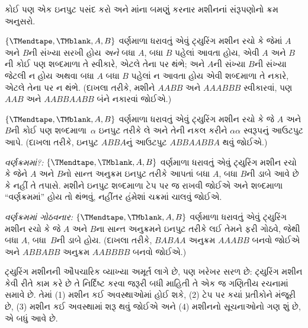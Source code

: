 \begin{prob}
કોઈ પણ એક ઇનપુટ પસંદ કરો અને માંના
બમણું કરનાર મશીનનાં સંરૂપણોનો ક્રમ અનુસરો.
\end{prob}

\begin{prob}
$\{\TMendtape,\TMblank, A, B\}$ વર્ણમાળા ધરાવતું એવું
ટ્યુરિંગ મશીન રચો કે જેમાં $A$ અને $B$ની સંખ્યા સરખી
હોય \emph{અને} બધા $A$, બધા $B$ પહેલાં આવતા હોય,
એવી $A$ અને $B$ની કોઈ પણ શબ્દમાળા તે સ્વીકારે,
એટલે તેના પર થંભે; અને $A$ની સંખ્યા $B$ની સંખ્યા
જેટલી ન હોય અથવા બધા $A$ બધા $B$ પહેલાં ન આવતા
હોય એવી શબ્દમાળા તે નકારે, એટલે તેના પર ન થંભે.
(દાખલા તરીકે, મશીને $AABB$ અને $AAABBB$ સ્વીકારવાં,
પણ $AAB$ અને $AABBAABB$ બંને નકારવાં જોઈએ.)
\end{prob}

\begin{prob}
$\{\TMendtape,\TMblank, A, B\}$ વર્ણમાળા ધરાવતું એવું
ટ્યુરિંગ મશીન રચો કે જે $A$ અને $B$ની કોઈ પણ
શબ્દમાળા~$\alpha$ ઇનપુટ તરીકે લે અને તેની નકલ કરીને
$\alpha\alpha$ સ્વરૂપનું આઉટપુટ આપે. (દાખલા તરીકે,
ઇનપુટ $ABBA$નું આઉટપુટ $ABBAABBA$ થવું જોઈએ.)
\end{prob}

\begin{prob}
\emph{વર્ણક્રમમાં?:} $\{\TMendtape,\TMblank, A, B\}$ વર્ણમાળા
ધરાવતું એવું ટ્યુરિંગ મશીન રચો કે જેને $A$ અને $B$નો
સાન્ત અનુક્રમ ઇનપુટ તરીકે આપતાં બધા $A$, બધા $B$ની
ડાબે આવે છે કે નહીં તે તપાસે. મશીને ઇનપુટ શબ્દમાળા ટેપ
પર જ રાખવી જોઈએ અને શબ્દમાળા ``વર્ણક્રમમાં'' હોય તો
થંભવું, નહીંતર હંમેશાં ચક્રમાં ચાલવું જોઈએ.
\end{prob}

\begin{prob}
\emph{વર્ણક્રમમાં ગોઠવનાર:} $\{\TMendtape,\TMblank, A, B\}$
વર્ણમાળા ધરાવતું એવું ટ્યુરિંગ મશીન રચો કે જે $A$ અને
$B$ના સાન્ત અનુક્રમને ઇનપુટ તરીકે લઈ તેમને ફરી ગોઠવે,
જેથી બધા $A$, બધા~$B$ની ડાબે હોય. (દાખલા તરીકે,
$BABAA$ અનુક્રમ $AAABB$ બનવો જોઈએ અને $ABBABB$
અનુક્રમ $AABBBB$ બનવો જોઈએ.)
\end{prob}
\endgroup


\begingroup
\makeatletter{}\makeatother

\label{guunit:OLP-0256}


\begin{explain}
ટ્યુરિંગ મશીનની ઔપચારિક વ્યાખ્યા અમૂર્ત લાગે છે, પણ ખરેખર
સરળ છે: ટ્યુરિંગ મશીન કેવી રીતે કામ કરે છે તે નિર્દિષ્ટ કરવા
જરૂરી બધી માહિતી તે એક જ ગણિતીય રચનામાં સમાવે છે. તેમાં
(1) મશીન કઈ અવસ્થાઓમાં હોઈ શકે, (2) ટેપ પર કયાં પ્રતીકોને
મંજૂરી છે, (3) મશીન કઈ અવસ્થામાં શરૂ થવું જોઈએ અને
(4) મશીનનો સૂચનાઓનો ગણ શું છે, એ બધું આવે છે.
\end{explain}

